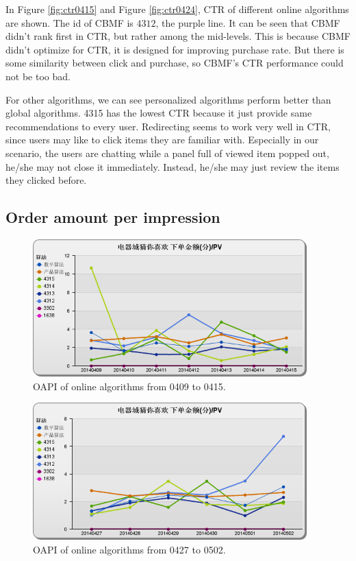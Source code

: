 In Figure \ref{fig:ctr0415} and Figure \ref{fig:ctr0424}, CTR of different online algorithms are shown. The id of CBMF is $4312$, the purple line. It can be seen that CBMF didn't rank first in CTR, but rather among the mid-levels. This is because CBMF didn't optimize for CTR, it is designed for improving purchase rate. But there is some similarity between click and purchase, so CBMF's CTR performance could not be too bad.

For other algorithms, we can see personalized algorithms perform better than global algorithms. 4315 has the lowest CTR because it just provide same recommendations to every user. Redirecting seems to work very well in CTR, since users may like to click items they are familiar with. Especially in our scenario, the users are chatting while a panel full of viewed item popped out, he/she may not close it immediately. Instead, he/she may just review the items they clicked before.

\subsection{Order amount per impression}

\begin{figure}
\begin{center}

\includegraphics[width=400px]{fig/yixunexp/OAPI0415.png}
\caption{\label{fig:oapi0415} OAPI of online algorithms  from 0409 to 0415.}
\end{center}
\end{figure}

\begin{figure}
\begin{center}



\includegraphics[width=400px]{fig/yixunexp/OAPI0427.png}
\caption{\label{fig:oapi0427} OAPI of online algorithms  from 0427 to 0502.}
\end{center}
\end{figure}

